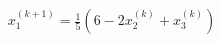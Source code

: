 \documentclass[preview]{standalone}
\begin{document}
\begin{align*}
x_1^{(k+1)} = \frac{1}{5}(6 - 2x_2^{(k)} + x_3^{(k)})
\end{align*}
\end{document}
